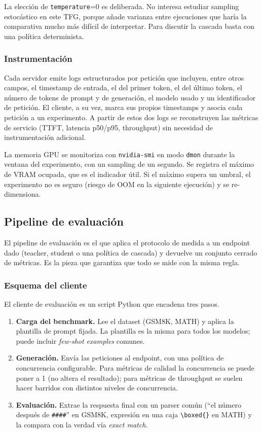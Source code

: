 \documentclass[11pt,a4paper]{article}
\begin{document}
La elección de \texttt{temperature}=0 es deliberada. No interesa estudiar sampling estocástico en este TFG, porque añade varianza entre ejecuciones que haría la comparativa mucho más difícil de interpretar. Para discutir la cascada basta con una política determinista.

\subsubsection{Instrumentación}

Cada servidor emite logs estructurados por petición que incluyen, entre otros campos, el timestamp de entrada, el del primer token, el del último token, el número de tokens de prompt y de generación, el modelo usado y un identificador de petición. El cliente, a su vez, marca sus propios timestamps y asocia cada petición a un experimento. A partir de estos dos logs se reconstruyen las métricas de servicio (TTFT, latencia p50/p95, throughput) sin necesidad de instrumentación adicional.

La memoria GPU se monitoriza con \texttt{nvidia-smi} en modo \texttt{dmon} durante la ventana del experimento, con un sampling de un segundo. Se registra el máximo de VRAM ocupada, que es el indicador útil. Si el máximo supera un umbral, el experimento no es seguro (riesgo de OOM en la siguiente ejecución) y se re-dimensiona.

\subsection{Pipeline de evaluación}

El pipeline de evaluación es el que aplica el protocolo de medida a un endpoint dado (teacher, student o una política de cascada) y devuelve un conjunto cerrado de métricas. Es la pieza que garantiza que todo se mide con la misma regla.

\subsubsection{Esquema del cliente}

El cliente de evaluación es un script Python que encadena tres pasos.

\begin{enumerate}[nosep,leftmargin=*]
\item \textbf{Carga del benchmark.} Lee el dataset (GSM8K, MATH) y aplica la plantilla de prompt fijada. La plantilla es la misma para todos los modelos; puede incluir \textit{few-shot examples} comunes.
\item \textbf{Generación.} Envía las peticiones al endpoint, con una política de concurrencia configurable. Para métricas de calidad la concurrencia se puede poner a 1 (no altera el resultado); para métricas de throughput se suelen hacer barridos con distintos niveles de concurrencia.
\item \textbf{Evaluación.} Extrae la respuesta final con un parser común (``el número después de \texttt{\#\#\#\#}'' en GSM8K, expresión en una caja \texttt{\textbackslash boxed\{\}} en MATH) y la compara con la verdad vía \textit{exact match}.
\end{enumerate}
\end{document}
